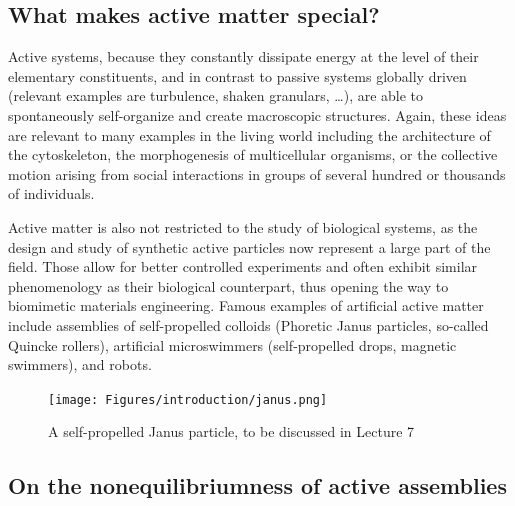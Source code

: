 
\subsection{What makes active matter special?}

Active systems, because they constantly dissipate energy at the level of their elementary constituents, and in contrast to passive systems globally driven (relevant examples are turbulence, shaken granulars, \ldots), are able to spontaneously self-organize and create macroscopic structures. 
Again, these ideas are relevant to many examples in the living world including the architecture of the cytoskeleton, the morphogenesis of multicellular organisms, or the collective motion arising from social interactions in groups of several hundred or thousands of individuals. 

Active matter is also not restricted to the study of biological systems, as the design and study of synthetic active particles now represent a large part of the field. Those allow for better controlled experiments and often exhibit similar phenomenology as their biological counterpart, thus opening the way to biomimetic materials engineering. 
Famous examples of artificial active matter include assemblies of self-propelled colloids (Phoretic Janus particles, so-called Quincke rollers), artificial microswimmers (self-propelled drops, magnetic swimmers), and robots.

\begin{figure}[!htb]
    \centering
    \texttt{[image: Figures/introduction/janus.png]}
    \caption{A self-propelled Janus particle, to be discussed in Lecture 7}
    \label{fig: janus}
\end{figure}



\subsection{On the nonequilibriumness of active assemblies}

